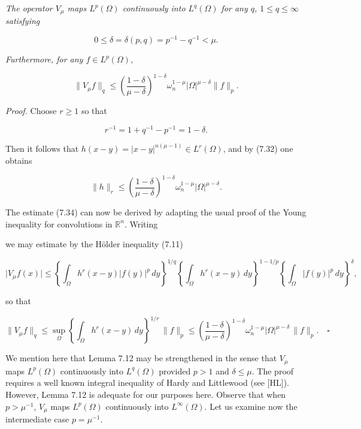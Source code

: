 \begin{lemma}\label{gt:lem-sobolev-riemann-potential-mapping}
\emph{The operator $V_\mu$ maps $L^p(\Omega)$ continuously into $L^q(\Omega)$ for any $q$,
$1 \le q \le \infty$ satisfying}

\begin{equation}
0 \le \delta = \delta(p,q)=p^{-1}-q^{-1} < \mu.
\tag{7.33}
\end{equation}

\emph{Furthermore, for any $f \in L^p(\Omega)$,}

\begin{equation}
\|V_\mu f\|_q \le \left(\frac{1-\delta}{\mu-\delta}\right)^{1-\delta}\omega_n^{1-\mu}|\Omega|^{\mu-\delta}\|f\|_p.
\tag{7.34}
\end{equation}

\textit{Proof.} Choose $r \ge 1$ so that

\[
r^{-1}=1+q^{-1}-p^{-1}=1-\delta.
\]

Then it follows that $h(x-y)=|x-y|^{n(\mu-1)} \in L^r(\Omega)$, and by (7.32) one obtains

\[
\|h\|_r \le \left(\frac{1-\delta}{\mu-\delta}\right)^{1-\delta}\omega_n^{1-\mu}|\Omega|^{\mu-\delta}.
\]

The estimate (7.34) can now be derived by adapting the usual proof of the Young
inequality for convolutions in $\mathbb{R}^n$. Writing



we may estimate by the Hölder inequality (7.11)

\[
\lvert V_\mu f(x)\rvert \le
\left\{\int_\Omega h^r(x-y)\lvert f(y)\rvert^p\,dy\right\}^{1/q}
\left\{\int_\Omega h^r(x-y)\,dy\right\}^{1-1/p}
\left\{\int_\Omega \lvert f(y)\rvert^p\,dy\right\}^{\delta},
\]

so that

\[
\|V_\mu f\|_q \le \sup_\Omega \left\{\int_\Omega h^r(x-y)\,dy\right\}^{1/r}\,\|f\|_p
\le \left(\frac{1-\delta}{\mu-\delta}\right)^{1-\delta}\omega_n^{1-\mu}\lvert\Omega\rvert^{\mu-\delta}\,\|f\|_p.\quad \square
\]

We mention here that Lemma 7.12 may be strengthened in the sense that $V_\mu$
maps $L^p(\Omega)$ continuously into $L^q(\Omega)$ provided $p>1$ and
$\delta\le\mu$. The proof requires a well known integral inequality of Hardy and
Littlewood (see [HL]). However, Lemma 7.12 is adequate for our purposes here.
Observe that when $p>\mu^{-1}$, $V_\mu$ maps $L^p(\Omega)$ continuously into
$L^\infty(\Omega)$. Let us examine now the intermediate case
$p=\mu^{-1}$.

\medskip

\end{lemma}

